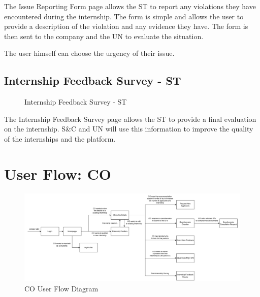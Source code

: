 \par The Issue Reporting Form page allows the ST to report any violations they have encountered during the
internship. The form is simple and allows the user to provide a description of the violation and any evidence they
have. The form is then sent to the company and the UN to evaluate the situation.

\par The user himself can choose the urgency of their issue.

\subsection{Internship Feedback Survey - ST}
\label{subsec:internship-feedback-survey-st}%

\begin{figure}[H]
    \centering
    \caption{Internship Feedback Survey - ST}
    \label{fig:internship-feedback-survey-st}
\end{figure}

\par The Internship Feedback Survey page allows the ST to provide a final evaluation on the internship. S\&C and UN
will use this information to improve the quality of the internships and the platform.

\section{User Flow: CO}
\label{sec:user-flow-co}%

\begin{figure}[H]
    \centering
    \includegraphics[width=1.0\textwidth]{Images/GUI/CO/Diagram.pdf}
    \caption{CO User Flow Diagram}
    \label{fig:co-user-flow-diagram}
\end{figure}

